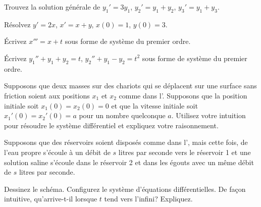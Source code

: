 \setcounter{exercise}{100}

\begin{exercise}
Trouvez la solution générale de $y_1' = 3 y_1$, $y_2' = y_1 + y_2$,
$y_3' = y_1 + y_3$.
\end{exercise}

\begin{exercise}
Résolvez $y'=2x$, $x'=x+y$, $x(0)=1$, $y(0)=3$.
\end{exercise}

\begin{exercise}
Écrivez $x''' = x+t$ sous forme de  système du premier ordre.
\end{exercise}

\begin{exercise}
Écrivez $y_1'' + y_1 + y_2 = t$, 
$y_2'' + y_1 - y_2 = t^2$ sous forme de  système du premier ordre.
\end{exercise}

\begin{exercise}
Supposons que deux masses sur des chariots qui se déplacent sur une surface sans friction soient aux positions $x_1$ et $x_2$ comme dans l'.
Supposons que la position initiale soit $x_1(0)=x_2(0)=0$ et que la vitesse initiale soit $x_1'(0) = x_2'(0) = a$ pour un nombre quelconque $a$.
Utilisez votre intuition pour résoudre le système différentiel et expliquez votre raisonnement.
\end{exercise}

\begin{exercise}
Supposons que des réservoirs soient disposés comme dans l', mais cette fois, de l'eau propre s'écoule à un débit de $s$ litres par seconde vers le réservoir 1 et une solution saline s'écoule dans le réservoir 2 et dans les égouts avec un même débit de $s$ litres par seconde.
\begin{tasks}
\task Dessinez le schéma.
\task Configurez le système d'équations différentielles.
\task De façon intuitive, qu'arrive-t-il lorsque $t$ tend vers l'infini? Expliquez.
\end{tasks}
\end{exercise}

